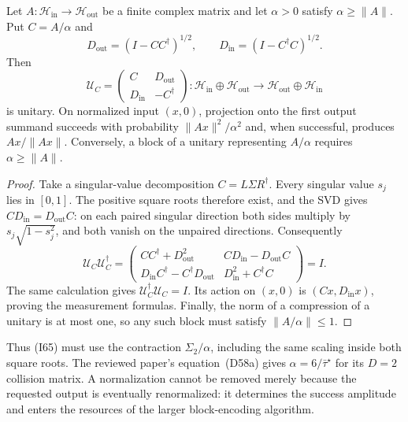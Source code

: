 \begin{proposition}
\label{prop:fluid-halmos-dilation}
Let $A:\mathcal H_{\mathrm{in}}\to\mathcal H_{\mathrm{out}}$ be a finite complex matrix and let $\alpha>0$ satisfy $\alpha\ge\|A\|$. Put $C=A/\alpha$ and
\[
 D_{\mathrm{out}}=(I-CC^\dagger)^{1/2},\qquad
 D_{\mathrm{in}}=(I-C^\dagger C)^{1/2}.
\]
Then
\[
 \mathcal U_C=
 \begin{pmatrix}C&D_{\mathrm{out}}\\D_{\mathrm{in}}&-C^\dagger\end{pmatrix}
 :\mathcal H_{\mathrm{in}}\oplus\mathcal H_{\mathrm{out}}
 \longrightarrow\mathcal H_{\mathrm{out}}\oplus\mathcal H_{\mathrm{in}}
\]
is unitary. On normalized input $(x,0)$, projection onto the first output summand succeeds with probability $\|Ax\|^2/\alpha^2$ and, when successful, produces $Ax/\|Ax\|$. Conversely, a block of a unitary representing $A/\alpha$ requires $\alpha\ge\|A\|$.
\end{proposition}
\begin{proof}
Take a singular-value decomposition $C=L\Sigma R^\dagger$. Every singular value $s_j$ lies in $[0,1]$. The positive square roots therefore exist, and the SVD gives
$CD_{\mathrm{in}}=D_{\mathrm{out}}C$: on each paired singular direction both sides multiply by $s_j\sqrt{1-s_j^2}$, and both vanish on the unpaired directions. Consequently
\[
 \mathcal U_C\mathcal U_C^\dagger
 =\begin{pmatrix}
 CC^\dagger+D_{\mathrm{out}}^2&CD_{\mathrm{in}}-D_{\mathrm{out}}C\\
 D_{\mathrm{in}}C^\dagger-C^\dagger D_{\mathrm{out}}&D_{\mathrm{in}}^2+C^\dagger C
 \end{pmatrix}=I.
\]
The same calculation gives $\mathcal U_C^\dagger\mathcal U_C=I$. Its action on $(x,0)$ is $(Cx,D_{\mathrm{in}}x)$, proving the measurement formulas. Finally, the norm of a compression of a unitary is at most one, so any such block must satisfy $\|A/\alpha\|\le1$.
\end{proof}

Thus (I65) must use the contraction $\Sigma_2/\alpha$, including the same scaling inside both square roots. The reviewed paper's equation~(D58a) gives $\alpha=6/\bar\tau^\star$ for its $D=2$ collision matrix. A normalization cannot be removed merely because the requested output is eventually renormalized: it determines the success amplitude and enters the resources of the larger block-encoding algorithm.

